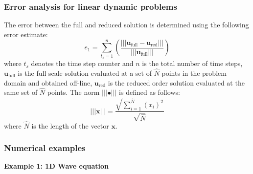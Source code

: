 \documentclass[10pt,letterpaper, onecolumn]{article}
\begin{document}
\subsubsection{Error analysis for linear dynamic problems}

The error between the full and reduced solution is determined using the following error estimate: 
%
\begin{equation}
e_1 = \sum^n_{t_s = 1} \left (  \frac{||| \bm{u}_{\text{full}} - \bm{u}_{\text{red}} |||}
{||| \bm{u}_{\text{full}} |||} \right )
\end{equation}
% 
where $t_s$ denotes the time step counter and $n$ is the total number of time steps, $\bm{u}_{\text{full}}$ is the full scale solution evaluated at a set of $\hat{N}$ points in the problem domain and obtained off-line, $\bm{u}_{\text{red}}$ is the reduced order solution evaluated at the same set of $\hat{N}$ points. The norm $||| \bullet |||$ is defined as follows:
%
\begin{equation}
||| \bm{x} ||| = \frac{\sqrt{\sum^{\hat{N}}_{i = 1}  (x_i)^2  } }{\sqrt{\hat{N}}}
\end{equation}
%
where $\hat{N}$ is the length of the vector $\bm{x}$.

\subsubsection{Numerical examples}
\noindent \textbf{Example 1: 1D Wave equation}
\end{document}
